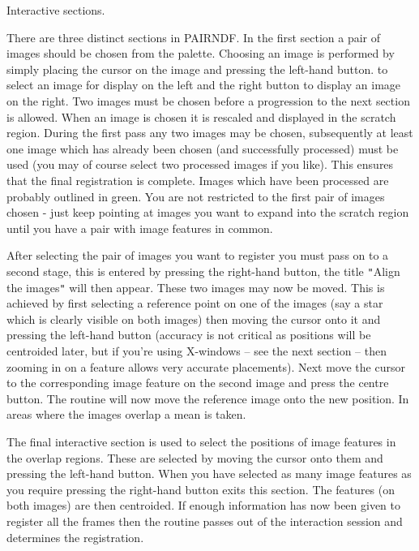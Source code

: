 \documentclass[twoside,11pt]{article}
\renewcommand{\_}{\texttt{\symbol{95}}}
\newcommand{\qt}[1]{{\tt "}#1{\tt "}}
\newcommand{\routine}[1]{{\sc #1}}
\newcommand{\sstitem}{\item}
\newcommand{\sstitem}{\item}
\begin{document}
{{{         \sstitem
         Interactive sections.

      }
        There are three distinct sections in \routine{PAIRNDF}. In the first
        section a pair of images should be chosen from the palette.
        Choosing an image is performed by simply placing the cursor on
        the image and pressing the left-hand button. to select an image
        for display on the left and the right button to display an
        image on the right. Two images must be chosen before a
        progression to the next section is allowed.  When an image is
        chosen it is rescaled and displayed in the scratch region.
        During the first pass any two images may be chosen,
        subsequently at least one image which has already been chosen
        (and successfully processed) must be used (you may of course
        select two processed images if you like). This ensures that
        the final registration is complete. Images which have been
        processed are probably outlined in green. You are not
        restricted to the first pair of images chosen - just keep
        pointing at images you want to expand into the scratch region
        until you have a pair with image features in common.

        After selecting the pair of images you want to register you
        must pass on to a second stage, this is entered by pressing the
        right-hand button, the title \qt{Align the images} will then
        appear. These two images may now be moved. This is achieved by
        first selecting a reference point on one of the images (say a
        star which is clearly visible on both images) then moving the
        cursor onto it and pressing the left-hand button (accuracy is
        not critical as positions will be centroided later, but if
        you're using X-windows -- see the next section -- then zooming
        in on a feature allows very accurate placements). Next move the
        cursor to the corresponding image feature on the second image
        and press the centre button. The routine will now move the
        reference image onto the new position. In areas where the
        images overlap a mean is taken.

        The final interactive section is used to select the positions of
        image features in the overlap regions. These are selected by
        moving the cursor onto them and pressing the left-hand button.
        When you have selected as many image features as you require
        pressing the right-hand button exits this section. The features
        (on both images) are then centroided. If enough information has
        now been given to register all the frames then the routine
        passes out of the interaction session and determines the
        registration.

}}
\end{document}
